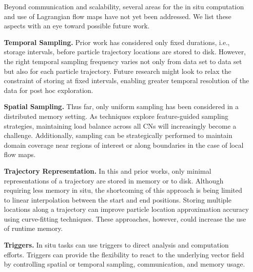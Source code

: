 %
Beyond communication and scalability, several areas for the in situ computation and use of Lagrangian flow maps have not yet been addressed.
%
We list these aspects with an eye toward possible future work.


\textbf{Temporal Sampling.} Prior work has considered only fixed durations, i.e., storage intervals, before particle trajectory locations are stored to disk. 
%
However, the right temporal sampling frequency varies not only from data set to data set but also for each particle trajectory.
%
Future research might look to relax the constraint of storing at fixed intervals, enabling greater temporal resolution of the data for post hoc exploration.
%

\textbf{Spatial Sampling.} Thus far, only uniform sampling has been considered in a distributed memory setting.
%
As techniques explore feature-guided sampling strategies, maintaining load balance across all CNs will increasingly become a challenge.
%
Additionally, sampling can be strategically performed to maintain domain coverage near regions of interest or along boundaries in the case of local flow maps.

\textbf{Trajectory Representation.} In this and prior works, only minimal representations of a trajectory are stored in memory or to disk.
%
Although requiring less memory in situ, the shortcoming of this approach is being limited to linear interpolation between the start and end positions. 
%
Storing multiple locations along a trajectory can improve particle location approximation accuracy using curve-fitting techniques.
%
These approaches, however, could increase the use of runtime memory. 

\textbf{Triggers.} In situ tasks can use triggers to direct analysis and computation efforts. 
%
Triggers can provide the flexibility to react to the underlying vector field by controlling spatial or temporal sampling, communication, and memory usage. 


